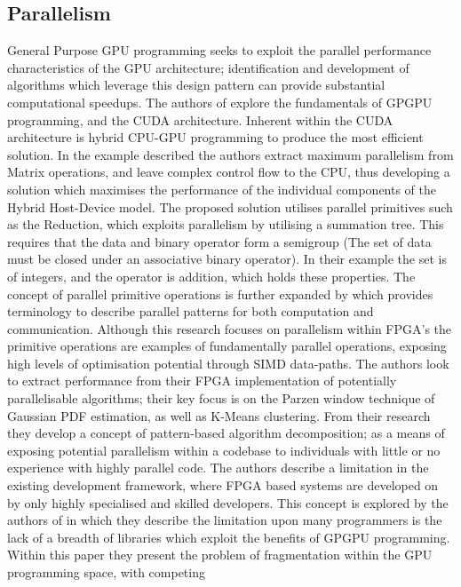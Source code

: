 \subsection{Parallelism}
General Purpose GPU programming seeks to exploit the parallel performance characteristics of the GPU
architecture; identification and development of algorithms which leverage this design pattern can
provide substantial computational speedups. The authors of \cite{papadrakakis2011new} explore the
fundamentals of GPGPU programming, and the CUDA architecture. Inherent within the CUDA architecture
is hybrid CPU-GPU programming to produce the most efficient solution. In the example described the
authors extract maximum parallelism from Matrix operations, and leave complex control flow to the
CPU, thus developing a solution which maximises the performance of the individual components of the
Hybrid Host-Device model. The proposed solution utilises parallel primitives such as the Reduction,
which exploits parallelism by utilising a summation tree. This requires that the data and binary
operator form a semigroup (The set of data must be closed under an associative binary operator). In
their example the set is of integers, and the operator is addition, which holds these properties.
The concept of parallel primitive operations is further expanded by \cite{nagrajan2011accelerating}
which provides terminology to describe parallel patterns for both computation and communication.
Although this research focuses on parallelism within FPGA’s the primitive operations are examples of
fundamentally parallel operations, exposing high levels of optimisation potential through SIMD
data-paths. The authors look to extract performance from their FPGA implementation of potentially
parallelisable algorithms; their key focus is on the Parzen window technique of Gaussian PDF
estimation, as well as K-Means clustering. From their research they develop a concept of
pattern-based algorithm decomposition; as a means of exposing potential parallelism within a
codebase to individuals with little or no experience with highly parallel code.  The authors
describe a limitation in the existing development framework, where FPGA based systems are developed
on by only highly specialised and skilled developers. This concept is explored by the authors of
\cite{sengupta2007scan} in which they describe the limitation upon many programmers is
the lack of a breadth of libraries which exploit the benefits of GPGPU programming.  Within this
paper they present the problem of fragmentation within the GPU programming space, with competing
